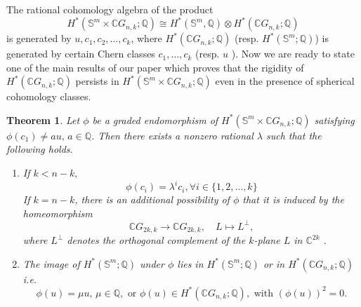 \documentclass{amsart}
\newtheorem{theorem}{Theorem}[section]
\begin{document}
	The rational cohomology algebra of the product
	\[
	H^*(\mathbb S^m \times \mathbb CG_{n,k};\mathbb Q)\cong H^*(\mathbb S^m,\mathbb Q)\otimes H^*(\mathbb CG_{n,k};\mathbb Q)
	\]
	is generated by $u,c_1,c_2,\dots,c_k$, where $H^*(\mathbb{C}G_{n,k};\mathbb{Q})$ (resp. $H^*(\mathbb S^m;\mathbb Q)$) is generated by certain Chern classes $c_1, \dots, c_k$ (resp. $u$%
). Now we %
are ready to state one of the main results of our paper which proves that the rigidity of $H^*(\mathbb CG_{n,k};\mathbb Q)$ persists in $H^*(\mathbb S^m \times \mathbb CG_{n,k};\mathbb Q)$ even in the presence of spherical cohomology classes.
	\begin{theorem}
		Let $\phi$ be a graded endomorphism of 
		$H^*(\mathbb S^{m}\times\mathbb C G_{n,k};\mathbb Q)$ 
		satisfying $\phi(c_1)\neq a u, \, a\in\mathbb Q$.  
		Then there exists a nonzero rational $\lambda$ such that the following %
holds.
		\begin{enumerate}\label{result main}
			\item If $k < n - k,$ 
			$$ \phi(c_i) = \lambda^i c_i, \forall i \in \{1,2,\dots,k\}$$
			If %
$k = n - k$, there is an additional possibility of $\phi$ that it is induced by the homeomorphism 
			\[
			\mathbb{C}G_{2k,k} \longrightarrow \mathbb{C}G_{2k,k}, 
			\quad L \longmapsto L^{\perp},
			\]
			where $L^{\perp}$ denotes the orthogonal complement of the $k$-plane $L$ in $\mathbb{C}^{2k}$%
.
			
			\item 
			The image of $H^*(\mathbb{S}^m;\mathbb{Q})$ under $\phi$ lies in 
			$H^*(\mathbb{S}^m;\mathbb{Q})$ or in $H^*(\mathbb{C}G_{n,k};\mathbb{Q})$ i.e. $$\phi(u) = \mu u,\, \mu \in \mathbb{Q}, \text{ or } \phi(u) \in H^*(\mathbb{C}G_{n,k};\mathbb{Q}), \text{ with } (\phi(u))^2 =0.$$
			
		\end{enumerate}
	\end{theorem}
\end{document}
